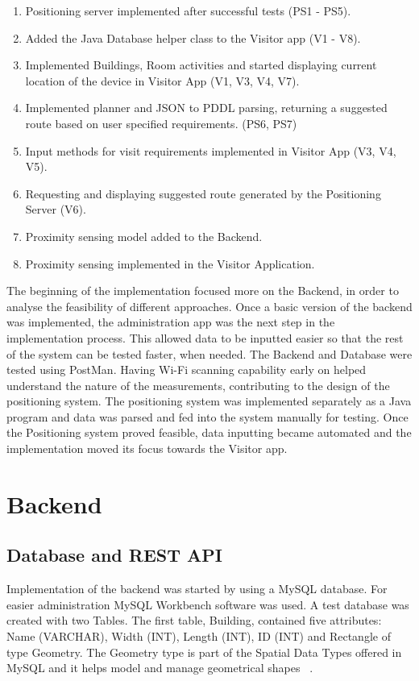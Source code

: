 \begin{enumerate}
	\item Positioning server implemented after successful tests (PS1 - PS5).
	\item Added the Java Database helper class to the Visitor app (V1 - V8).
	\item Implemented Buildings, Room activities and started displaying current location of the device in Visitor App (V1, V3, V4, V7).	
	\item Implemented planner and JSON to PDDL parsing, returning a suggested route based on user specified requirements. (PS6, PS7)
	\item Input methods for visit requirements implemented in Visitor App (V3, V4, V5).
	\item Requesting and displaying suggested route generated by the Positioning Server (V6).
	\item Proximity sensing model added to the Backend.
	\item Proximity sensing implemented in the Visitor Application.
\end{enumerate}
The beginning of the implementation focused more on the Backend, in order to analyse the feasibility of different approaches. Once a basic version of the backend was implemented, the administration app was the next step in the implementation process. This allowed data to be inputted easier so that the rest of the system can be tested faster, when needed. The Backend and Database were tested using PostMan. Having Wi-Fi scanning capability early on helped understand the nature of the measurements, contributing to the design of the positioning system. The positioning system was implemented separately as a Java program and data was parsed and fed into the system manually for testing. Once the Positioning system proved feasible, data inputting became automated and the implementation moved its focus towards the Visitor app.

\section{Backend}
\subsection{Database and REST API}
Implementation of the backend was started by using a MySQL database. For easier administration MySQL Workbench software was used. A test database was created with two Tables. The first table, Building, contained five attributes: Name (VARCHAR), Width (INT), Length (INT), ID (INT) and Rectangle of type Geometry. The Geometry type is part of the Spatial Data Types offered in MySQL and it helps model and manage geometrical shapes ~\cite{MySql}.

